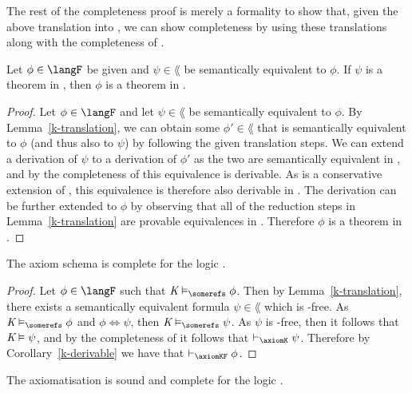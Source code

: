The rest of the completeness proof is merely a formality to show that, given the
above translation into \lang{}, we can show completeness by using these
translations along with the completeness of \logicK{}.

\begin{corollary}\label{k-derivable}
Let $\phi \in \langF$ be given and $\psi \in \lang$ be semantically
equivalent to $\phi$.  If $\psi$ is a theorem in \logicK{}, then $\phi$ is a
theorem in \axiomKF{}.
\end{corollary}

\begin{proof} %
Let $\phi \in \langF$ and let $\psi \in \lang$ be semantically equivalent to
$\phi$. By Lemma~\ref{k-translation}, we can obtain some $\phi' \in \lang$
that is semantically equivalent to $\phi$ (and thus also to $\psi$) by following
the given translation steps. We can extend a derivation of $\psi$ to a
derivation of $\phi'$ as the two are semantically equivalent in \logicK{}, and by
the completeness of \logicK{} this equivalence is derivable. As \axiomKF{} is a
conservative extension of \logicK{}, this equivalence is therefore also derivable
in \axiomKF{}. The derivation can be further extended to $\phi$ by observing that all
of the reduction steps in Lemma~\ref{k-translation} are provable equivalences
in \axiomKF{}. Therefore $\phi$ is a theorem in \axiomKF{}.
\end{proof}

\begin{lemma}\label{k-complete}
The axiom schema \axiomKF{} is complete for the logic \logicKF{}.
\end{lemma}

\begin{proof}
Let $\phi \in \langF$ such that $\classK \entails_\somerefs \phi$. Then by
Lemma~\ref{k-translation}, there exists a semantically equivalent formula
$\psi \in \lang$ which is \somerefs-free. As $\classK \entails_\somerefs \phi$ and
$\phi \iff \psi$, then $\classK \entails_\somerefs \psi$. As $\psi$ is
\somerefs-free, then it follows that $\textit{K} \vDash \psi$, and by the
completeness of \axiomKF{} it follows that $\proves_{\axiomK} \psi$.
Therefore by Corollary~\ref{k-derivable} we have that $\proves_{\axiomKF}
\phi$.
\end{proof}

\begin{theorem}
The axiomatisation \axiomKF{} is sound and complete for the logic \logicKF{}.
\end{theorem}

